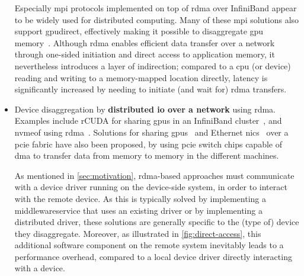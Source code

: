 \begin{itemize}
        Especially \gls{mpi} protocols implemented on top of \gls{rdma} over InfiniBand appear to be widely used for distributed computing.
        Many of these \gls{mpi} solutions also support \gls{gpudirect}, effectively making it possible to \gls{disaggregate} \gls{gpu} memory~\cite{Venkatesh2014,Venkatesh2017,url:Rosetti2014}.
        Although \gls{rdma} enables efficient data transfer over a network through one-sided initiation and direct access to application memory, it nevertheless introduces a layer of indirection;
        compared to a \gls{cpu} (or device) reading and writing to a memory-mapped location directly, latency is significantly increased by needing to initiate (and wait for) \gls{rdma} transfers.


    \item Device \gls{disaggregation} by \textbf{distributed \gls{io} over a network} using \gls{rdma}.
        Examples include rCUDA for sharing \glspl{gpu} in an InfiniBand cluster~\cite{Duato2010}, and \gls{nvmeof} using \gls{rdma}~\cite{Guz2018,spec:NVMe-oF}.
        Solutions for sharing \glspl{gpu}~\cite{Hou2013} and Ethernet \glspl{nic}~\cite{Tu2014} over a \gls{pcie} fabric have also been proposed, by using \gls{pcie} switch chips capable of \gls{dma} to transfer data from memory to memory in the different machines.
        

        As mentioned in \cref{sec:motivation}, \gls{rdma}-based approaches must communicate with a device driver running on the device-side system, in order to interact with the remote device.
        As this is typically solved by implementing a \gls{middlewareservice} that uses an existing driver or by implementing a distributed driver, these solutions are generally specific to the (type of) device they \gls{disaggregate}.
        Moreover, as illustrated in \cref{fig:direct-access}, this additional software component on the remote system inevitably leads to a performance overhead, compared to a local device driver directly interacting with a device. %

\end{itemize}
%




